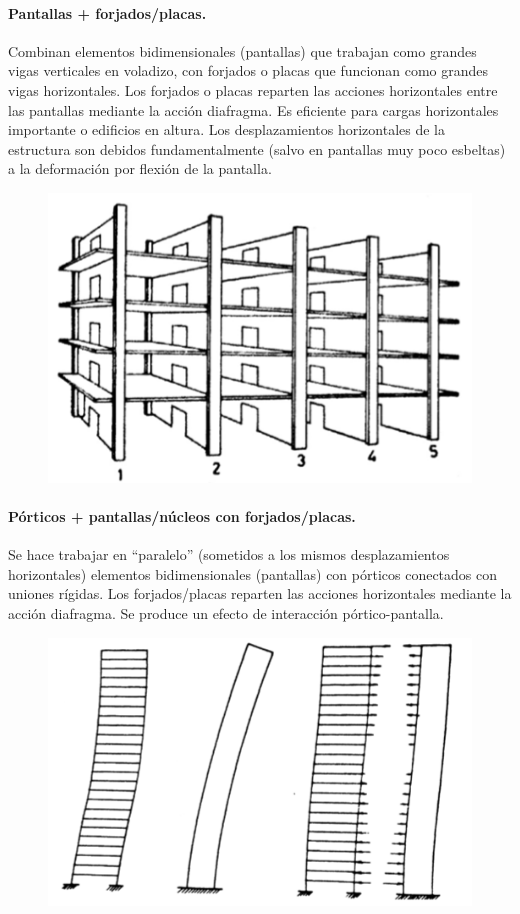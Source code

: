 \paragraph{Pantallas + forjados/placas.}
Combinan elementos bidimensionales (pantallas) que trabajan como grandes vigas verticales en voladizo, con forjados o placas que funcionan como grandes vigas horizontales. Los forjados o placas reparten las acciones horizontales entre las pantallas mediante la acción diafragma. Es eficiente para cargas horizontales importante o edificios en altura. Los desplazamientos horizontales de la estructura son debidos fundamentalmente (salvo en pantallas muy poco esbeltas) a la deformación por flexión de la pantalla.

\begin{figure}[H]
    \centering
    \includegraphics[width=0.75\linewidth]{Imagenes/Pantallas + forjados.png}
\end{figure}

\paragraph{Pórticos + pantallas/núcleos con forjados/placas.}
Se hace trabajar en ``paralelo'' (sometidos a los mismos desplazamientos horizontales) elementos bidimensionales (pantallas) con pórticos conectados con uniones rígidas. Los forjados/placas reparten las acciones horizontales mediante la acción diafragma. Se produce un efecto de interacción pórtico-pantalla.

\begin{figure}[H]
    \centering
    \includegraphics[width=0.75\linewidth]{Imagenes/Porticos + nucleos con forjados.png}
\end{figure}

